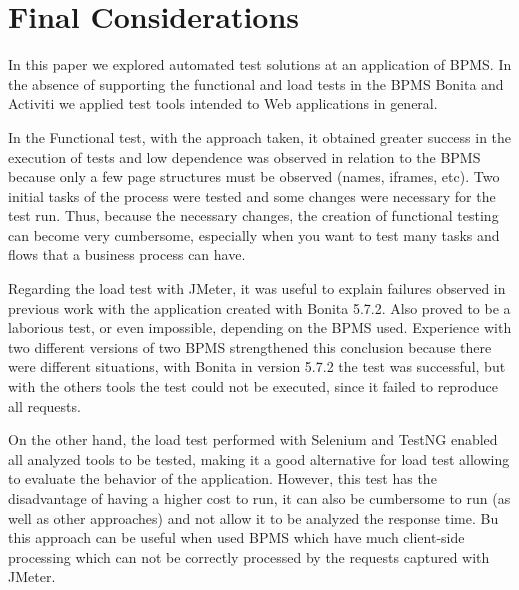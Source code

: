 \documentclass[runningheads,a4paper]{llncs}
\begin{document}
\section{Final Considerations}\label{s:conclu}

In this paper we explored automated test solutions at an application of BPMS. In the absence of supporting the functional and load tests in the BPMS Bonita and Activiti we applied test tools intended to Web applications in general.

In the Functional test, with the approach taken, it obtained greater success in the execution of tests and low dependence was observed in relation to the BPMS because only a few page structures must be observed (names, iframes, etc). Two initial tasks of the process  were tested and some changes were necessary for the test run. Thus, because the necessary changes, the creation of functional testing can become very cumbersome, especially when you want to test many tasks and flows that a business process can have.

Regarding the load test with JMeter, it was useful to explain failures observed in previous work with the application created with Bonita 5.7.2. Also proved to be a laborious test, or even impossible, depending on the BPMS used. Experience with two different versions of two BPMS strengthened this conclusion because there were different situations, with Bonita in version 5.7.2 the test was successful, but with the others tools the test could not be executed, since it failed to reproduce all requests. 

On the other hand, the load test performed with Selenium and TestNG enabled all analyzed tools to be tested, making it a good alternative for load test allowing to evaluate the behavior of the application. However, this test has the disadvantage of having a higher cost to run, it can also be cumbersome to run (as well as other approaches) and not allow it to be analyzed the response time. Bu this approach can be useful when used BPMS which have much client-side processing which can not be correctly processed by the requests captured with JMeter.
\end{document}
